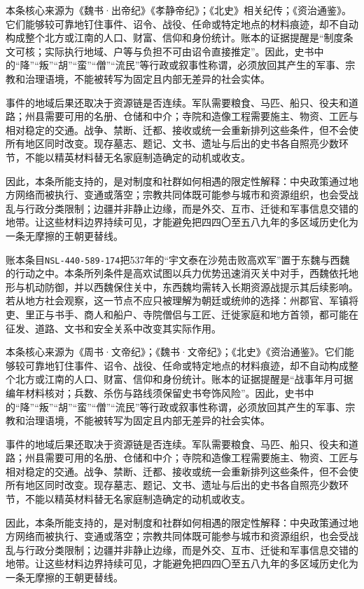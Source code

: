 本条核心来源为《魏书·出帝纪》《孝静帝纪》；《北史》相关纪传；《资治通鉴》。它们能够较可靠地钉住事件、诏令、战役、任命或特定地点的材料痕迹，却不自动构成整个北方或江南的人口、财富、信仰和身份统计。账本的证据提醒是“制度条文可核；实际执行地域、户等与负担不可由诏令直接推定”。因此，史书中的“降”“叛”“胡”“蛮”“僧”“流民”等行政或叙事性称谓，必须放回其产生的军事、宗教和治理语境，不能被转写为固定且内部无差异的社会实体。

事件的地域后果还取决于资源链是否连续。军队需要粮食、马匹、船只、役夫和道路；州县需要可用的名册、仓储和中介；寺院和造像工程需要施主、物资、工匠与相对稳定的交通。战争、禁断、迁都、接收或统一会重新排列这些条件，但不会使所有地区同时改变。现存墓志、题记、文书、遗址与后出的史书各自照亮少数环节，不能以精英材料替无名家庭制造确定的动机或收支。

因此，本条所能支持的，是对制度和社群如何相遇的限定性解释：中央政策通过地方网络而被执行、变通或落空；宗教共同体既可能参与城市和资源组织，也会受战乱与行政分类限制；边疆并非静止边缘，而是外交、互市、迁徙和军事信息交错的地带。让这些材料边界持续可见，才能避免把四四〇至五八九年的多区域历史化为一条无摩擦的王朝更替线。

账本条目\texttt{NSL-440-589-174}把537年的“宇文泰在沙苑击败高欢军”置于东魏与西魏的行动之中。本条所列条件是高欢试图以兵力优势迅速消灭关中对手，西魏依托地形与机动防御，并以西魏保住关中，东西魏均需转入长期资源战提示其后续影响。若从地方社会观察，这一节点不应只被理解为朝廷或统帅的选择：州郡官、军镇将吏、里正与书手、商人和船户、寺院僧侣与工匠、迁徙家庭和地方首领，都可能在征发、道路、文书和安全关系中改变其实际作用。

本条核心来源为《周书·文帝纪》；《魏书·文帝纪》；《北史》《资治通鉴》。它们能够较可靠地钉住事件、诏令、战役、任命或特定地点的材料痕迹，却不自动构成整个北方或江南的人口、财富、信仰和身份统计。账本的证据提醒是“战事年月可据编年材料核对；兵数、杀伤与路线须保留史书夸饰风险”。因此，史书中的“降”“叛”“胡”“蛮”“僧”“流民”等行政或叙事性称谓，必须放回其产生的军事、宗教和治理语境，不能被转写为固定且内部无差异的社会实体。

事件的地域后果还取决于资源链是否连续。军队需要粮食、马匹、船只、役夫和道路；州县需要可用的名册、仓储和中介；寺院和造像工程需要施主、物资、工匠与相对稳定的交通。战争、禁断、迁都、接收或统一会重新排列这些条件，但不会使所有地区同时改变。现存墓志、题记、文书、遗址与后出的史书各自照亮少数环节，不能以精英材料替无名家庭制造确定的动机或收支。

因此，本条所能支持的，是对制度和社群如何相遇的限定性解释：中央政策通过地方网络而被执行、变通或落空；宗教共同体既可能参与城市和资源组织，也会受战乱与行政分类限制；边疆并非静止边缘，而是外交、互市、迁徙和军事信息交错的地带。让这些材料边界持续可见，才能避免把四四〇至五八九年的多区域历史化为一条无摩擦的王朝更替线。

